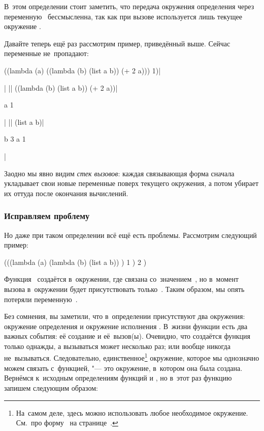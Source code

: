 В~этом определении стоит заметить, что передача окружения определения 
через переменную~ бессмысленна, так как при вызове используется лишь
текущее окружение .

Давайте теперь ещё раз рассмотрим пример, приведённый выше. Сейчас переменные
не~пропадают:

\begin{code:lisp}
((lambda (a) ((lambda (b) (list a b)) (+ 2 a))) 1)|\begin{where}
                                                   \- 
                                                   \end{where}|
|\equals| ((lambda (b) (list a b)) (+ 2 a))|\begin{where}
                                            \- a {\is} 1
                                            \- 
                                            \end{where}|
|\equals| (list a b)|\begin{where}
                     \- b {\is} 3
                     \- a {\is} 1
                     \- 
                     \end{where}|
\end{code:lisp}

Заодно мы явно видим \emph{стек вызовов}: каждая связывающая форма сначала
укладывает свои новые переменные поверх текущего окружения, а потом убирает их
оттуда после окончания вычислений.


\subsubsection{Исправляем проблему}

Но даже при таком определении всё ещё есть проблемы. Рассмотрим следующий
пример:

\begin{code:lisp}
(((lambda (a)
     (lambda (b) (list a b)) )
  1 )
 2 )
\end{code:lisp}

Функция~ создаётся в~окружении, где  связана
со~значением~, но в~момент вызова в~окружении будет присутствовать
только~. Таким образом, мы опять потеряли переменную~.

Без сомнения, вы заметили, что в~определении  присутствуют
два окружения: окружение определения  и окружение исполнения
. В~жизни функции есть два важных события: её создание и
её~вызов(ы). Очевидно, что создаётся функция только однажды, а вызываться может
несколько раз; или вообще никогда не~вызываться. Следовательно,
единственное\footnote{На~самом деле, здесь можно использовать любое необходимое
окружение. См.~про форму~ на
странице~\pageref{assignement/assignement/para:closure}.} окружение, которое мы
однозначно можем связать с~функцией, "--- это окружение, в~котором она была
создана. Вернёмся к~исходным определениям функций  и ,
но в~этот раз функцию~ запишем следующим образом:

